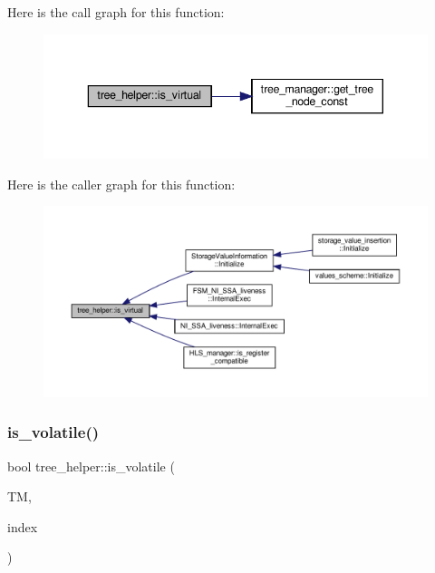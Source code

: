 Here is the call graph for this function\+:
\nopagebreak
\begin{figure}[H]
\begin{center}
\leavevmode
\includegraphics[width=343pt]{d7/d99/classtree__helper_a781409acb18b2d81e9eaa3dcec97f90d_cgraph}
\end{center}
\end{figure}
Here is the caller graph for this function\+:
\nopagebreak
\begin{figure}[H]
\begin{center}
\leavevmode
\includegraphics[width=350pt]{d7/d99/classtree__helper_a781409acb18b2d81e9eaa3dcec97f90d_icgraph}
\end{center}
\end{figure}
\mbox{\label{classtree__helper_ae79793b8505fcb90640915552fa680bc}} 
\subsubsection{\texorpdfstring{is\+\_\+volatile()}{is\_volatile()}}
{\footnotesize\ttfamily bool tree\+\_\+helper\+::is\+\_\+volatile (\begin{DoxyParamCaption}\item[{const \hyperlink{tree__manager_8hpp_a792e3f1f892d7d997a8d8a4a12e39346}{tree\+\_\+manager\+Const\+Ref} \&}]{TM,  }\item[{const unsigned int}]{index }\end{DoxyParamCaption})\hspace{0.3cm}{\ttfamily [static]}}



